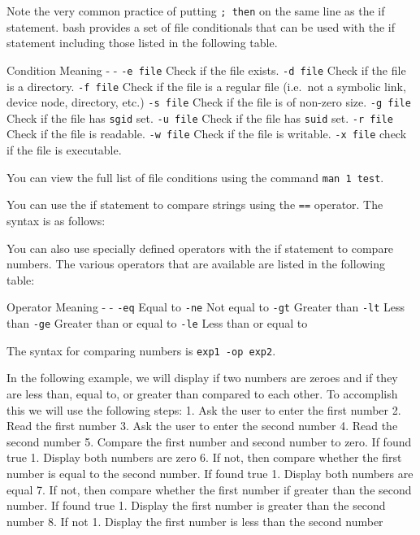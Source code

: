 Note the very common practice of putting \texttt{; then} on the same
line as the if statement. bash provides a set of file conditionals that
can be used with the if statement including those listed in the
following table.

Condition \textbar{} Meaning - \textbar{} - \texttt{-e file} \textbar{}
Check if the file exists. \texttt{-d file} \textbar{} Check if the file
is a directory. \texttt{-f file} \textbar{} Check if the file is a
regular file (i.e.~not a symbolic link, device node, directory, etc.)
\texttt{-s file} \textbar{} Check if the file is of non-zero size.
\texttt{-g file} \textbar{} Check if the file has \texttt{sgid} set.
\texttt{-u file} \textbar{} Check if the file has \texttt{suid} set.
\texttt{-r file} \textbar{} Check if the file is readable.
\texttt{-w file} \textbar{} Check if the file is writable.
\texttt{-x file} \textbar{} check if the file is executable.

You can view the full list of file conditions using the command
\texttt{man 1 test}.

You can use the if statement to compare strings using the \texttt{==}
operator. The syntax is as follows:

\begin{Shaded}
\begin{Highlighting}[]
\KeywordTok{if [} \OtherTok{==} \KeywordTok{ ]} \NormalTok{; }
\end{Highlighting}
\end{Shaded}

You can also use specially defined operators with the if statement to
compare numbers. The various operators that are available are listed in
the following table:

Operator \textbar{} Meaning - \textbar{} - \texttt{-eq} \textbar{} Equal
to \texttt{-ne} \textbar{} Not equal to \texttt{-gt} \textbar{} Greater
than \texttt{-lt} \textbar{} Less than \texttt{-ge} \textbar{} Greater
than or equal to \texttt{-le} \textbar{} Less than or equal to

The syntax for comparing numbers is \texttt{exp1 -op exp2}.

In the following example, we will display if two numbers are zeroes and
if they are less than, equal to, or greater than compared to each other.
To accomplish this we will use the following steps: 1. Ask the user to
enter the first number 2. Read the first number 3. Ask the user to enter
the second number 4. Read the second number 5. Compare the first number
and second number to zero. If found true 1. Display both numbers are
zero 6. If not, then compare whether the first number is equal to the
second number. If found true 1. Display both numbers are equal 7. If
not, then compare whether the first number if greater than the second
number. If found true 1. Display the first number is greater than the
second number 8. If not 1. Display the first number is less than the
second number


